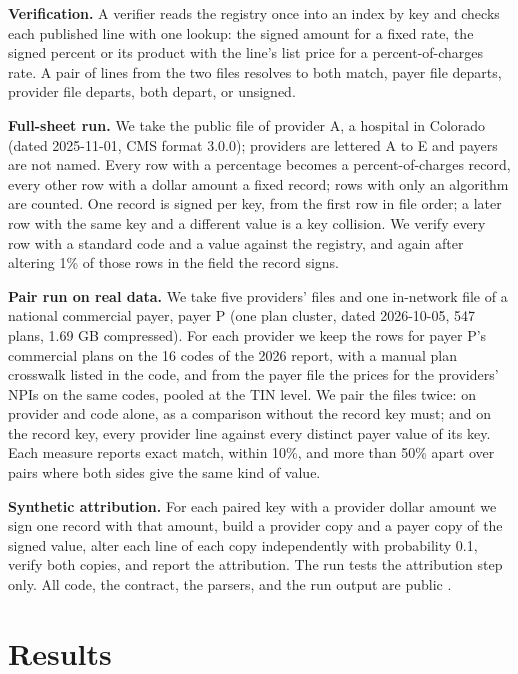 \documentclass{IOS-Book-Article}
\begin{document}
\textbf{Verification.} A verifier reads the registry once into an index by key and checks each published line with one lookup: the signed amount for a fixed rate, the signed percent or its product with the line's list price for a percent-of-charges rate. A pair of lines from the two files resolves to both match, payer file departs, provider file departs, both depart, or unsigned.

\textbf{Full-sheet run.} We take the public file of provider A, a hospital in Colorado (dated 2025-11-01, CMS format 3.0.0); providers are lettered A to E and payers are not named. Every row with a percentage becomes a percent-of-charges record, every other row with a dollar amount a fixed record; rows with only an algorithm are counted. One record is signed per key, from the first row in file order; a later row with the same key and a different value is a key collision. We verify every row with a standard code and a value against the registry, and again after altering 1\% of those rows in the field the record signs.

\textbf{Pair run on real data.} We take five providers' files and one in-network file of a national commercial payer, payer P (one plan cluster, dated 2026-10-05, 547 plans, 1.69 GB compressed). For each provider we keep the rows for payer P's commercial plans on the 16 codes of the 2026 report, with a manual plan crosswalk listed in the code, and from the payer file the prices for the providers' NPIs on the same codes, pooled at the TIN level. We pair the files twice: on provider and code alone, as a comparison without the record key must; and on the record key, every provider line against every distinct payer value of its key. Each measure reports exact match, within 10\%, and more than 50\% apart over pairs where both sides give the same kind of value.

\textbf{Synthetic attribution.} For each paired key with a provider dollar amount we sign one record with that amount, build a provider copy and a payer copy of the signed value, alter each line of each copy independently with probability 0.1, verify both copies, and report the attribution. The run tests the attribution step only. All code, the contract, the parsers, and the run output are public \cite{repo}.

\section{Results}
\end{document}
